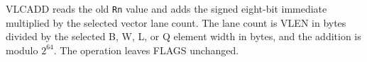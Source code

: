 VLCADD reads the old \texttt{Rn} value and adds the signed eight-bit
immediate multiplied by the selected vector lane count.  The lane count is
VLEN in bytes divided by the selected B, W, L, or Q element width in bytes,
and the addition is modulo $2^{64}$.  The operation leaves FLAGS unchanged.
